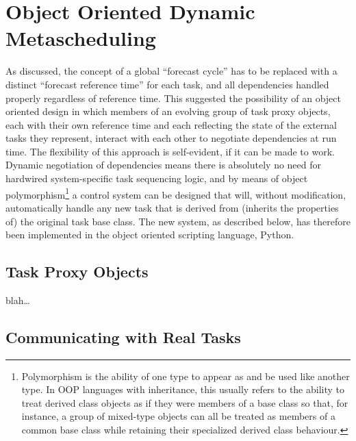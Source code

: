 \documentclass[11pt,a4paper]{article}
\begin{document}
\section{Object Oriented Dynamic Metascheduling}

As discussed, the concept of a global ``forecast cycle'' has to be
replaced with a distinct ``forecast reference time'' for each task, and
all dependencies handled properly regardless of reference time. This
suggested the possibility of an object oriented design in which members
of an evolving group of task proxy objects, each with their own
reference time and each reflecting the state of the external tasks they
represent, interact with each other to negotiate dependencies at run
time.  The flexibility of this approach is self-evident, if it can be
made to work.  Dynamic negotiation of dependencies means there is
absolutely no need for hardwired system-specific task sequencing logic,
and by means of object polymorphism\footnote{Polymorphism is the ability
of one type to appear as and be used like another type. In OOP languages
with inheritance, this usually refers to the ability to treat derived
class objects as if they were members of a base class so that, for
instance, a group of mixed-type objects can all be treated as members of
a common base class while retaining their specialized derived class
behaviour.} a control system can be designed that will, without
modification, automatically handle any new task that is derived from
(inherits the properties of) the original task base class.  The new
system, as described below, has therefore been implemented in the object
oriented scripting language, Python.

\subsection{Task Proxy Objects}

blah\dots

\label{sec-task-messaging}
\subsection{Communicating with Real Tasks}
\end{document}
